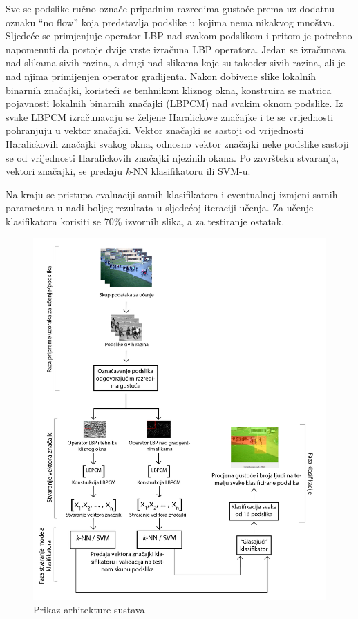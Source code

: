 \documentclass[times, utf8, zavrsni, numeric]{fer}
\begin{document}
Sve se podslike ručno označe pripadnim razredima gustoće prema
\citep{polus} uz dodatnu oznaku \enquote{no flow} koja 
predstavlja podslike u kojima nema nikakvog mnoštva. Sljedeće se primjenjuje
operator LBP nad svakom podslikom i pritom je potrebno napomenuti da
 postoje dvije vrste izračuna LBP operatora. Jedan se izračunava nad slikama 
sivih razina, a drugi nad slikama koje su također sivih razina, ali je nad njima 
primijenjen operator gradijenta. Nakon dobivene slike lokalnih binarnih 
značajki, koristeći se tenhnikom kliznog okna, konstruira se matrica 
pojavnosti lokalnih binarnih značajki (LBPCM) nad svakim oknom podslike. 
Iz svake LBPCM izračunavaju se željene Haralickove značajke i te se vrijednosti
pohranjuju u vektor značajki. Vektor značajki se sastoji od vrijednosti
Haralickovih značajki svakog okna, odnosno vektor značajki neke podslike 
sastoji se od vrijednosti Haralickovih značajki njezinih okana. Po završteku 
stvaranja, vektori značajki, se predaju \textit{k}-NN klasifikatoru ili SVM-u.

\newpage

Na kraju se pristupa evaluaciji samih klasifikatora i eventualnoj izmjeni
samih parametara u nadi boljeg rezultata u sljedećoj iteraciji učenja. Za učenje
klasifikatora korisiti se \(70\%\) izvornih slika, a za testiranje ostatak.

\begin{figure}[!ht]
\centering
\includegraphics[scale=0.18]{img/somprobajzbrisati.png}
\caption{Prikaz arhitekture sustava}
\end{figure}
\end{document}
